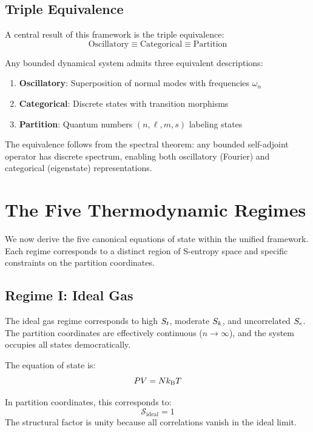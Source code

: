 \subsection{Triple Equivalence}

A central result of this framework is the triple equivalence:
\begin{equation}
\boxed{\text{Oscillatory} \equiv \text{Categorical} \equiv \text{Partition}}
\end{equation}

Any bounded dynamical system admits three equivalent descriptions:
\begin{enumerate}
    \item \textbf{Oscillatory}: Superposition of normal modes with frequencies $\omega_n$
    \item \textbf{Categorical}: Discrete states with transition morphisms
    \item \textbf{Partition}: Quantum numbers $(n, \ell, m, s)$ labeling states
\end{enumerate}

The equivalence follows from the spectral theorem: any bounded self-adjoint operator has discrete spectrum, enabling both oscillatory (Fourier) and categorical (eigenstate) representations.

\section{The Five Thermodynamic Regimes}
\label{sec:regimes}

We now derive the five canonical equations of state within the unified framework. Each regime corresponds to a distinct region of S-entropy space and specific constraints on the partition coordinates.

\subsection{Regime I: Ideal Gas}

The ideal gas regime corresponds to high $S_t$, moderate $S_k$, and uncorrelated $S_e$. The partition coordinates are effectively continuous ($n \to \infty$), and the system occupies all states democratically.

The equation of state is:
\begin{equation}
PV = Nk_{\mathrm{B}} T
\end{equation}

In partition coordinates, this corresponds to:
\begin{equation}
\mathcal{S}_{\text{ideal}} = 1
\end{equation}
The structural factor is unity because all correlations vanish in the ideal limit.

